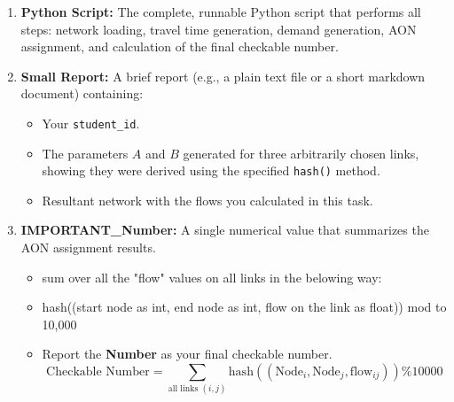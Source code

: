 \documentclass{rapportCS} %
\begin{document}
\begin{enumerate}
    \item \textbf{Python Script:} The complete, runnable Python script that performs all steps: network loading, travel time generation, demand generation, AON assignment, and calculation of the final checkable number.
    \item \textbf{Small Report:} A brief report (e.g., a plain text file or a short markdown document) containing:
    \begin{itemize}
        \item Your \texttt{student\_id}.
        \item The parameters \( A \) and \( B \) generated for three arbitrarily chosen links, showing they were derived using the specified \texttt{hash()} method.
        \item Resultant network with the flows you calculated in this task.
    \end{itemize}
    \item \textbf{IMPORTANT\_Number:} A single numerical value that summarizes the AON assignment results.
        \begin{itemize}
            \item sum over all the "flow" values on all links in the belowing way:
            \item[] hash((start node as int, end node as int, flow on the link as float)) mod to 10,000
            \item Report the \textbf{Number} as your final checkable number.
            $$ \text{Checkable Number} = \sum_{\text{all links } (i,j)} \text{hash}((\text{Node}_i, \text{Node}_j, \text{flow}_{ij})) \% 10000 $$
        \end{itemize}
    \end{enumerate}

%
% 
\end{document}
